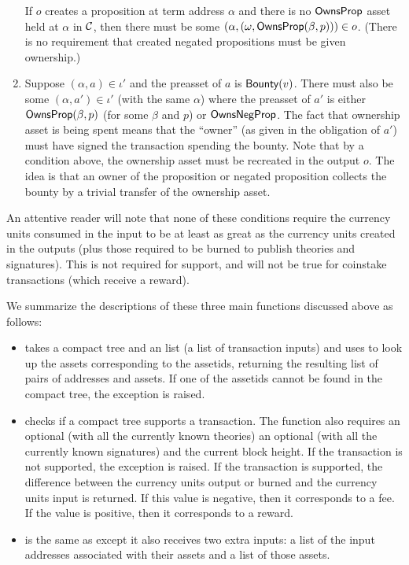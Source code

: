 \begin{enumerate}
If $o$ creates a proposition at term address $\alpha$
and there is no ${\constr{OwnsProp}}$ asset held at $\alpha$ in $\mathcal{C}$,
then there must be some
$(\alpha,(\omega,{\constr{OwnsProp}}(\beta,p)))\in o$.
(There is no requirement that created negated propositions must be given ownership.)
\item {}
Suppose $(\alpha,a)\in\iota'$
and the preasset of $a$ is ${\constr{Bounty}}(v)$.
There must also be some $(\alpha,a')\in\iota'$ (with the same $\alpha$)
where the preasset of $a'$ is either ${\constr{OwnsProp}}(\beta,p)$
(for some $\beta$ and $p$)
or ${\constr{OwnsNegProp}}$.
The fact that ownership asset is being spent means that the ``owner'' (as given in the obligation of $a'$)
must have signed the transaction spending the bounty.
Note that by a condition above, the ownership asset must be recreated in the output $o$.
The idea is that an owner of the proposition or negated proposition collects
the bounty by a trivial transfer of the ownership asset.
\end{enumerate}
An attentive reader will note that none of these conditions require the currency units consumed
in the input to be at least as great as the currency units created in the outputs (plus those
required to be burned to publish theories and signatures).
This is not required for support,
and will not be true for coinstake transactions (which receive a reward).

We summarize the descriptions of these three main functions discussed above as follows:
\begin{itemize}
\item {} takes a compact tree and an
{} list (a list of transaction inputs)
and uses {} to look up the assets corresponding to
the assetids, returning the resulting list of pairs of addresses and assets.
If one of the assetids cannot be found in the compact tree,
the exception {} is raised.
\item {} checks if a compact tree supports a transaction.
The function also requires an optional {} (with all the currently known theories)
an optional {} (with all the currently known signatures)
and the current block height.
If the transaction is not supported, the exception {} is raised.
If the transaction is supported,
the difference between the currency units output or burned and the currency units input
is returned. If this value is negative, then it corresponds to a fee.
If the value is positive, then it corresponds to a reward.
\item {} is the same as {}
except it also receives two extra inputs:
a list of the input addresses associated with their assets
and a list of those assets.
\end{itemize}

